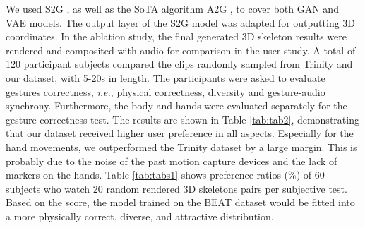 \documentclass[runningheads]{llncs}
\begin{document}
We used S2G \cite{ginosar2019learning}, as well as the SoTA algorithm A2G \cite{li2021audio2gestures}, to cover both GAN and VAE models. The output layer of the S2G model was adapted for outputting 3D coordinates. In the ablation study, the final generated 3D skeleton results were rendered and composited with audio for comparison in the user study. A total of 120 participant subjects compared the clips randomly sampled from Trinity and our dataset, with 5-20s in length. The participants were asked to evaluate gestures correctness, \textit{i.e.}, physical correctness, diversity and gesture-audio synchrony. Furthermore, the body and hands were evaluated separately for the gesture correctness test. The results are shown in Table \ref{tab:tab2}, demonstrating that our dataset received higher user preference in all aspects. Especially for the hand movements, we outperformed the Trinity dataset by a large margin. This is probably due to the noise of the past motion capture devices and the lack of markers on the hands. Table \ref{tab:tabs1} shows preference ratios (\%) of 60 subjects who watch 20 random rendered 3D skeletons pairs per subjective test. Based on the score, the model trained on the BEAT dataset would be fitted into a more physically correct, diverse, and attractive distribution.
\end{document}
